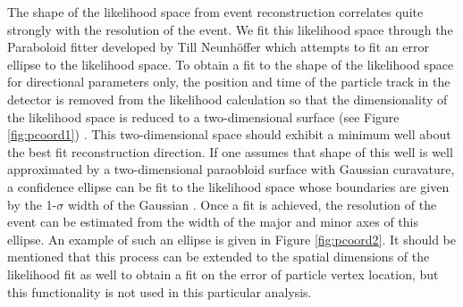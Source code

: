 \documentclass{gatech-thesis}
\begin{document}
The shape of the likelihood space from event reconstruction correlates quite strongly with the resolution of the event. We fit this likelihood space through the Paraboloid fitter developed by Till Neunh\"{o}ffer \cite{2006APh....25..220N} which attempts to fit an error ellipse to the likelihood space. To obtain a fit to the shape of the likelihood space for directional parameters only, the position and time of the particle track in the detector is removed from the likelihood calculation so that the dimensionality of the likelihood space is reduced to a two-dimensional surface (see Figure \ref{fig:pcoord1}) \cite{2006APh....25..220N}. This two-dimensional space should exhibit a minimum well about the best fit reconstruction direction. If one assumes that shape of this well is well approximated by a two-dimensional paraobloid surface with Gaussian curavature, a confidence ellipse can be fit to the likelihood space whose boundaries are given by the 1-$\sigma$ width of the Gaussian \cite{2006APh....25..220N}. Once a fit is achieved, the resolution of the event can be estimated from the width of the major and minor axes of this ellipse. An example of such an ellipse is given in Figure \ref{fig:pcoord2}. It should be mentioned that this process can be extended to the spatial dimensions of the likelihood fit as well to obtain a fit on the error of particle vertex location, but this functionality is not used in this particular analysis.
\end{document}
